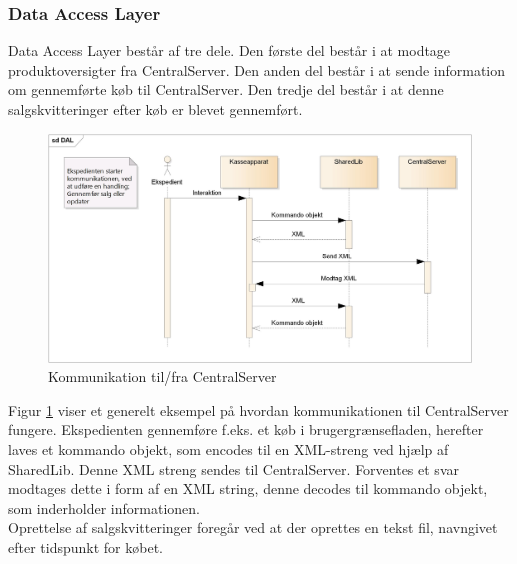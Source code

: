 \subsubsection{Data Access Layer}
Data Access Layer består af tre dele. Den første del består i at modtage produktoversigter fra CentralServer. Den anden del består i at sende information om gennemførte køb til CentralServer. Den tredje del består i at denne salgskvitteringer efter køb er blevet gennemført.

\begin{figure}[H]
	\centering
	\includegraphics[width=\textwidth]{Projektbeskrivelse/DesignOgImplementering/Frontend/Pics/DALsq}
	\caption{Kommunikation til/fra CentralServer}
	\label{fig:KAtCS}
\end{figure}

Figur \ref{fig:KAtCS} viser et generelt eksempel på hvordan kommunikationen til CentralServer fungere. Ekspedienten gennemføre f.eks. et køb i brugergrænsefladen, herefter laves et kommando objekt, som encodes til en XML-streng ved hjælp af SharedLib. Denne XML streng sendes til CentralServer. Forventes et svar modtages dette i form af en XML string, denne decodes til kommando objekt, som inderholder informationen.\\
Oprettelse af salgskvitteringer foregår ved at der oprettes en tekst fil, navngivet efter tidspunkt for købet.
